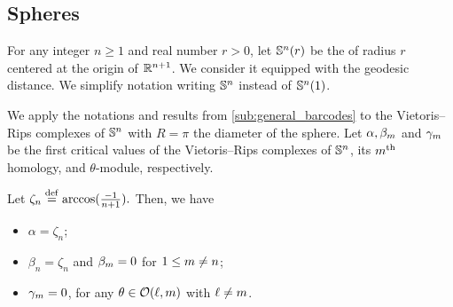 \subsection{Spheres}\label{ss:Sn}

For any integer $n \geq 1$ and real number $r > 0$, let $\mathbb{S}^n(r)$ be the  of radius $r$ centered at the origin of $\mathbb{R}^{n+1}$.
We consider it equipped with the geodesic distance.
We simplify notation writing \(\mathbb{S}^n\) instead of \(\mathbb{S}^n(1)\).

\label{subsub:critical values of Sn}

We apply the notations and results from \cref{sub:general_barcodes} to the Vietoris--Rips complexes of $\mathbb{S}^n$ with $R=\pi$ the diameter of the sphere. 
Let $\alpha, \beta_m$ and $\gamma_m$ be the first critical values of the Vietoris--Rips complexes of $\mathbb{S}^n$, its $m^{\mathrm{th}}$ homology, and $\theta$-module, respectively.

\medskip\proposition
Let \(\zeta_n \stackrel{\mathrm{def}}{=} \arccos(\tfrac{-1}{n+1}).\) Then, we have
\begin{itemize}
    \item $\alpha = \zeta_n$;
    \item $\beta_n =\zeta_n$ and $\beta_m = 0$ for $1\leq m \neq n$;
    \item $\gamma_m = 0$, for any \(\theta \in \mathcal{O}(\ell,m)\) with \(\ell \neq m\).
\end{itemize}

